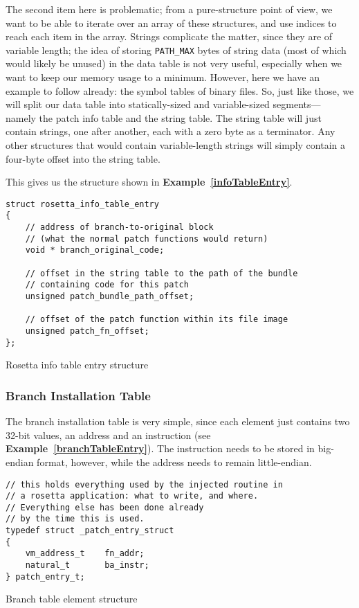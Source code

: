 \documentclass[english]{article}
\begin{document}
The second item here is problematic; from a pure-structure point of view, we want to be able to iterate over an array of these structures, and use indices to reach each item in the array. Strings complicate the matter, since they are of variable length; the idea of storing \texttt{PATH\_MAX} bytes of string data (most of which would likely be unused) in the data table is not very useful, especially when we want to keep our memory usage to a minimum. However, here we have an example to follow already: the symbol tables of binary files. So, just like those, we will split our data table into statically-sized and variable-sized segments--- namely the patch info table and the string table. The string table will just contain strings, one after another, each with a zero byte as a terminator. Any other structures that would contain variable-length strings will simply contain a four-byte offset into the string table.

This gives us the structure shown in \textbf{Example~\ref{infoTableEntry}}.

\begin{sourcecode}
\begin{verbatim}
struct rosetta_info_table_entry
{
    // address of branch-to-original block
    // (what the normal patch functions would return)
    void * branch_original_code;

    // offset in the string table to the path of the bundle
    // containing code for this patch
    unsigned patch_bundle_path_offset;

    // offset of the patch function within its file image
    unsigned patch_fn_offset;
};
\end{verbatim}
\caption{Rosetta info table entry structure}
\label{infoTableEntry}
\end{sourcecode}

\subsubsection{Branch Installation Table}
The branch installation table is very simple, since each element just contains two 32-bit values, an address and an instruction (see \textbf{Example~\ref{branchTableEntry}}). The instruction needs to be stored in big-endian format, however, while the address needs to remain little-endian.

\begin{sourcecode}
\begin{verbatim}
// this holds everything used by the injected routine in 
// a rosetta application: what to write, and where. 
// Everything else has been done already 
// by the time this is used.
typedef struct _patch_entry_struct
{
    vm_address_t    fn_addr;
    natural_t       ba_instr;
} patch_entry_t;
\end{verbatim}
\caption{Branch table element structure}
\label{branchTableEntry}
\end{sourcecode}
\end{document}
